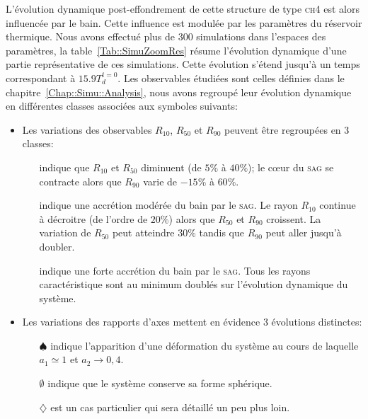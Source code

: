 	L'évolution dynamique post-effondrement de cette structure de type \textsc{ch4} est alors influencée par le bain. Cette influence est modulée
	par les paramètres du réservoir thermique. Nous avons effectué plus de 300 simulations dans l'espaces des paramètres, la
	table~\ref{Tab::SimuZoomRes} résume l'évolution dynamique d'une partie représentative de ces simulations. Cette évolution s'étend jusqu'à un
	temps correspondant à $15.9 T_d^{t=0}$.
	Les observables étudiées sont celles définies dans le chapitre~\ref{Chap::Simu::Analysis}, nous avons regroupé leur évolution dynamique en
	différentes classes associées aux symboles suivants:
	

	\begin{itemize}

		\item Les variations des observables $R_{10}$, $R_{50}$ et $R_{90}$ peuvent être regroupées en 3 classes:
			\begin{itemize}

				\item[\accretionpeu{}] indique que $R_{10}$ et $R_{50}$ diminuent (de $5\%$ à $40\%$); le cœur du \textsc{sag} se
					contracte alors que $R_{90}$ varie de $-15\%$ à $60\%$.

				\item[\accretionmoyen{}] indique une accrétion modérée du bain par le \textsc{sag}. Le rayon $R_{10}$ continue
					à décroitre (de l'ordre de $20\%$) alors que $R_{50}$ et $R_{90}$ croissent. La variation de $R_{50}$ peut
					atteindre $30\%$ tandis que $R_{90}$ peut aller jusqu'à doubler.

				\item[\accretionlot{}] indique une forte accrétion du bain par le \textsc{sag}. Tous les rayons caractéristique sont
					au minimum doublés sur l'évolution dynamique du système.
			\end{itemize}

		\item Les variations des rapports d'axes mettent en évidence 3 évolutions distinctes:
			\begin{itemize}

				\item[$\spadesuit$] indique l'apparition d'une déformation du système au cours de laquelle $a_1 \simeq 1$ et $a_2 \to 0,4$.

				\item[$\emptyset$] indique que le système conserve sa forme sphérique.

				\item[$\diamondsuit$] est un cas particulier qui sera détaillé un peu plus loin.

			\end{itemize}
	\end{itemize}

